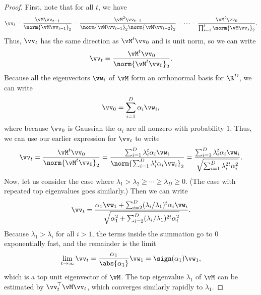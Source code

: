 \documentclass[../../book-main.tex]{subfiles}
\begin{document}
\begin{proof} First, note that for all \(t\), we have
    \begin{equation}
        \vv_{t} = \frac{\vM\vv_{t - 1}}{\norm{\vM\vv_{t - 1}}_{2}} =
        \frac{\vM^{2}\vv_{t - 2}}{\norm{\vM\vv_{t -
        1}}_{2}\norm{\vM\vv_{t - 2}}_{2}} = \cdots =
        \frac{\vM^{t}\vv_{0}}{\prod_{s = 1}^{t}\norm{\vM\vv_{s}}_{2}}.
    \end{equation}
    Thus, \(\vv_{t}\) has the same direction as \(\vM^{t}\vv_{0}\)
    and is unit norm, so we can write
    \begin{equation}
        \vv_{t} = \frac{\vM^{t}\vv_{0}}{\norm{\vM^{t}\vv_{0}}_{2}}.
    \end{equation}
    Because all the eigenvectors \(\vw_{i}\) of $\vM$ form an
    orthonormal basis for \(\R^{D}\), we can write
    \begin{equation}
        \vv_{0} = \sum_{i = 1}^{D}\alpha_{i}\vw_{i},
    \end{equation}
    where because \(\vv_{0}\) is Gaussian the \(\alpha_{i}\) are all
    nonzero with probability \(1\). Thus, we can use our earlier
    expression for \(\vv_{t}\) to write
    \begin{equation}
        \vv_{t} = \frac{\vM^{t}\vv_{0}}{\norm{\vM^{t}\vv_{0}}_{2}} =
        \frac{\sum_{i =
        1}^{D}\lambda_{i}^{t}\alpha_{i}\vw_{i}}{\norm{\sum_{i =
        1}^{D}\lambda_{i}^{t}\alpha_{i}\vw_{i}}_{2}} = \frac{\sum_{i
        = 1}^{D}\lambda_{i}^{t}\alpha_{i}\vw_{i}}{\sqrt{\sum_{i =
        1}^{D}\lambda_{i}^{2t}\alpha_{i}^{2}}}.
    \end{equation}
    Now, let us consider the case where \(\lambda_{1} > \lambda_{2}
    \geq \cdots \geq \lambda_{D} \geq 0\). (The case with repeated
    top eigenvalues goes similarly.) Then we can write
    \begin{equation}
        \vv_{t} = \frac{\alpha_{1}\vw_{1} + \sum_{i =
        2}^{D}(\lambda_{i}/\lambda_{1})^{t}\alpha_{i}\vw_{i}}{\sqrt{\alpha_{1}^{2}
        + \sum_{i = 2}^{D}(\lambda_{i}/\lambda_{1})^{2t}\alpha_{i}^{2}}}.
    \end{equation}
    Because \(\lambda_{1} > \lambda_{i}\) for all \(i > 1\), the
    terms inside the summation go to \(0\) exponentially fast, and
    the remainder is the limit
    \begin{equation}
        \lim_{t \to \infty}\vv_{t} =
        \frac{\alpha_{1}}{\abs{\alpha_{1}}}\vw_{1} = \sign(\alpha_{1})\vw_{1},
    \end{equation}
    which is a top unit eigenvector of \(\vM\). The top eigenvalue
    \(\lambda_{1}\) of \(\vM\) can be estimated by
    \(\vv_{t}^{\top}\vM\vv_{t}\), which converges similarly rapidly
    to \(\lambda_{1}\).
\end{proof}
\end{document}
